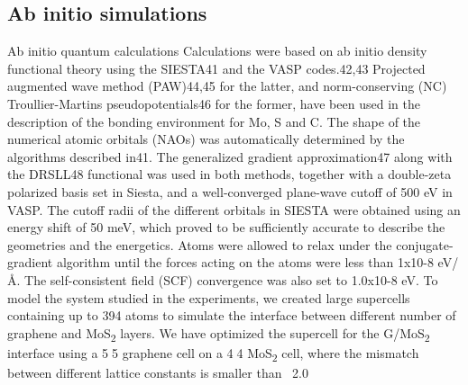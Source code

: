 \subsection{	Ab initio simulations}
\label{sec:ab-init-simul}
Ab initio quantum calculations
Calculations were based on ab initio density functional theory using the SIESTA41 and the VASP codes.42,43 Projected augmented wave method (PAW)44,45 for the latter, and norm-conserving (NC) Troullier-Martins pseudopotentials46 for the former, have been used in the description of the bonding environment for Mo, S and C. The shape of the numerical atomic orbitals (NAOs) was automatically determined by the algorithms described in41. The generalized gradient approximation47 along with the DRSLL48 functional was used in both methods, together with a double-zeta polarized basis set in Siesta, and a well-converged plane-wave cutoff of 500 eV in VASP. The cutoff radii of the different orbitals in SIESTA were obtained using an energy shift of 50 meV, which proved to be sufficiently accurate to describe the geometries and the energetics. Atoms were allowed to relax under the conjugate-gradient algorithm until the forces acting on the atoms were less than 1x10-8 eV/Å. The self-consistent field (SCF) convergence was also set to 1.0x10-8 eV. To model the system studied in the experiments, we created large supercells containing up to 394 atoms to simulate the interface between different number of graphene and MoS\textsubscript{2} layers. We have optimized the supercell for the G/MoS\textsubscript{2} interface using a 55 graphene cell on a 44 MoS\textsubscript{2} cell, where the mismatch between different lattice constants is smaller than ~2.0%
